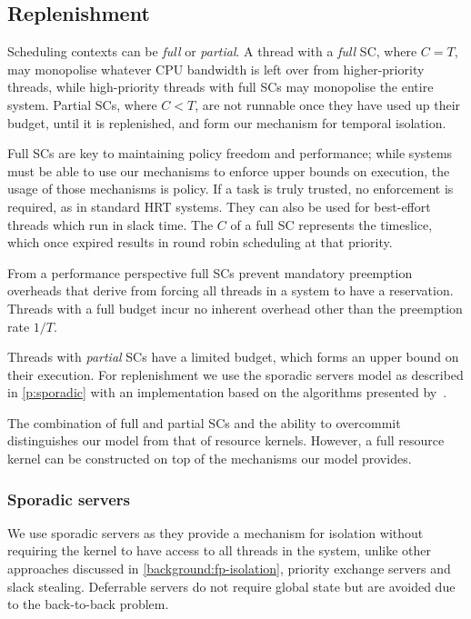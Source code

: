 \subsection{Replenishment}

Scheduling contexts can be \emph{full} or \emph{partial}. A thread with a \emph{full} SC, where
\(C=T\), may monopolise whatever
CPU bandwidth is left over from higher-priority threads, while high-priority threads with full
\glspl{SC} may monopolise the entire system. 
Partial \glspl{SC}, where \(C<T\), are not runnable once
they have used up their budget, until it is replenished, and form our mechanism for temporal
isolation.  

Full \glspl{SC} are key to maintaining policy freedom and performance; while systems
must be able to use our mechanisms to enforce upper bounds on execution, the usage of 
those mechanisms is policy. If a task is truly trusted, no enforcement is required,
as in standard \gls{HRT} systems. They can also be used for best-effort threads which run in slack time.
The \(C\) of a full \gls{SC} represents the timeslice, which once expired results in round robin
scheduling at that priority. 

From a performance perspective full \glspl{SC} prevent mandatory preemption overheads 
that derive from forcing all threads in a system to have a reservation. Threads with a full
budget incur no inherent overhead other than the preemption rate $1/T$.

Threads with \emph{partial} \glspl{SC} have a limited budget, which forms an upper
bound on their execution. For replenishment we
use the sporadic servers model as described in \cref{p:sporadic} with an
implementation based on the algorithms presented
by~\citet{Stanovic_BWH_10}. 

The combination of full and partial \glspl{SC}  and the ability to overcommit distinguishes our
model from that of resource kernels. However, a full resource kernel can be 
constructed on top of the mechanisms our model provides.

\subsubsection{Sporadic servers}
\label{s:sporadic}
We use sporadic servers as they provide a mechanism for isolation without requiring the kernel
to have access to all threads in the system, unlike other approaches discussed in
\cref{background:fp-isolation}, \eg  priority exchange servers and slack stealing.
Deferrable servers do not require global state but are avoided due to the back-to-back
problem. 

